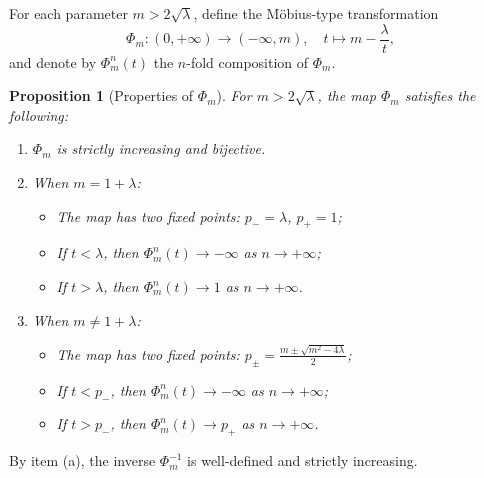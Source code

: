 \documentclass{amsart}
\newtheorem{Proposition}[Definition]{Proposition}
\theoremstyle{definition}
\begin{document}
For each parameter $m > 2\sqrt{\lambda}$, define the M\"{o}bius-type transformation
\[
\Phi_m : (0, +\infty) \to (-\infty, m), \quad t \mapsto m - \frac{\lambda}{t},
\]
and denote by $\Phi_m^n(t)$ the $n$-fold composition of $\Phi_m$.

\begin{Proposition}[Properties of $\Phi_m$]\label{assyp}
For $m > 2\sqrt{\lambda}$, the map $\Phi_m$ satisfies the following:
\begin{enumerate}
    \item $\Phi_m$ is strictly increasing and bijective.
    \item When $m = 1 + \lambda$:
    \begin{itemize}
        \item The map has two fixed points: $p_- = \lambda$, $p_+ = 1$;
        \item If $t < \lambda$, then $\Phi_m^n(t) \to -\infty$ as $n \to +\infty$;
        \item If $t > \lambda$, then $\Phi_m^n(t) \to 1$ as $n \to +\infty$.
    \end{itemize}
    \item When $m \neq 1 + \lambda$:
    \begin{itemize}
        \item The map has two fixed points: $p_\pm = \frac{m \pm \sqrt{m^2 - 4\lambda}}{2}$;
        \item If $t < p_-$, then $\Phi_m^n(t) \to -\infty$ as $n \to +\infty$;
        \item If $t > p_-$, then $\Phi_m^n(t) \to p_+$ as $n \to +\infty$.
    \end{itemize}
\end{enumerate}
\end{Proposition}

By item (a), the inverse $\Phi^{-1}_m$ is well-defined and strictly increasing.
\end{document}
